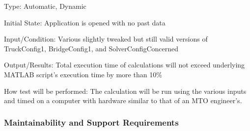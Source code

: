 \documentclass[12pt, titlepage]{article}
\begin{document}
\begin{enumerate}
Type: Automatic, Dynamic

Initial State: Application is opened with no past data

Input/Condition: Various slightly tweaked but still valid versions of TruckConfig1, BridgeConfig1, and SolverConfigConcerned

Output/Results: Total execution time of calculations will not exceed underlying MATLAB script's execution time by more than 10\%

How test will be performed: The calculation will be run using the various inputs and timed on a computer with hardware similar to that of an MTO engineer's.

\end{enumerate}

\subsubsection{Maintainability and Support Requirements}
\end{document}
